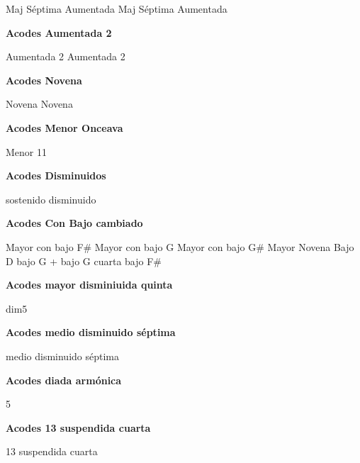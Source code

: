 \small
{} Maj S\'eptima Aumentada
 Maj S\'eptima Aumentada
\normalsize

\vskip 20pt
\textbf{Acodes Aumentada 2}
\vskip 25pt

\small
{} Aumentada 2
 Aumentada 2
\normalsize


\vskip 20pt
\textbf{Acodes Novena}
\vskip 25pt

\small
{} Novena
 Novena
\normalsize

\vskip 20pt
\textbf{Acodes Menor Onceava}
\vskip 25pt

\small
{} Menor 11
\normalsize


\vskip 20pt
\textbf{Acodes Disminuidos}
\vskip 25pt

\small
{} sostenido disminuido
\normalsize


\vskip 20pt
\textbf{Acodes Con Bajo cambiado}
\vskip 25pt

\small
{} \hfill
{} \hfill\null\break
\vskip 20pt
 \hfill
{} \hfill\null\break
\vskip 20pt
 \hfill
{} \hfill\null\break
\vskip 20pt
 \hfill\null\break
\vskip 20pt
 \hfill\null\break
\vskip 20pt
 \hfill
{} \hfill
{} \hfill\null\break
\vskip 20pt
 \hfill
{} \hfill
{} Mayor con bajo F\# \hfill\null\break
\vskip 20pt
 Mayor con bajo G \hfill
{} Mayor con bajo G\# \hfill
{} \hfill\null\break
\vskip 20pt
 \hfill\null\break
\vskip 20pt
 Mayor Novena Bajo D \hfill
{} bajo G \hfill
{} + bajo G \hfill\null\break
\vskip 20pt
 cuarta bajo F\# \hfill\null\break
\normalsize

\vskip 20pt
\textbf{Acodes mayor disminiuida quinta}
\vskip 25pt

\small
{} dim5
\normalsize

\vskip 20pt
\textbf{Acodes medio disminuido s\'eptima}
\vskip 25pt

\small
{} medio disminuido s\'eptima
\normalsize

\vskip 20pt
\textbf{Acodes diada arm\'onica}
\vskip 25pt

\small
{} 5
\normalsize

\vskip 20pt
\textbf{Acodes 13 suspendida cuarta}
\vskip 25pt

\small
{} 13 suspendida cuarta
\normalsize

\clearpage
\fi
%
